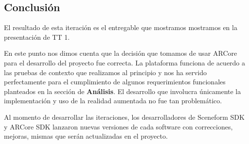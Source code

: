 \subsection{Conclusión}
El resultado de esta iteración es el entregable que mostramos mostramos en la presentación de TT 1. \par
En este punto nos dimos cuenta que la decisión que tomamos de usar ARCore para el desarrollo del proyecto fue correcta. La plataforma funciona de acuerdo a las pruebas de contexto que realizamos al principio y nos ha servido perfectamente para el cumplimiento de algunos requerimientos funcionales planteados en la sección de \textbf{Análisis}. El desarrollo que involucra únicamente la implementación y uso de la realidad aumentada no fue tan problemático. \par Al momento de desarrollar las iteraciones, los desarrolladores de Sceneform SDK y ARCore SDK lanzaron nuevas versiones de cada software con correcciones, mejoras, mismas que serán actualizadas en el proyecto. 
\clearpage